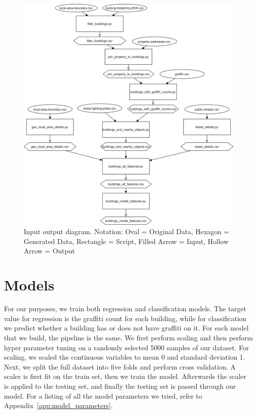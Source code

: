 \begin{figure}
   \centering
   \includegraphics[width=\textwidth]{images/MethodologyInputOutputDiagram.png}
   \caption{Input output diagram. Notation: Oval = Original Data, Hexagon = Generated Data, Rectangle = Script, Filled Arrow = Input, Hollow Arrow = Output}
   \label{fig:methodology}
\end{figure}


\section{Models}

For our purposes, we train both regression and classification models. The target value for regression is the graffiti count for each building, while for classification we predict whether a building has or does not have graffiti on it. For each model that we build, the pipeline is the same. We first perform scaling and then perform hyper parameter tuning on a randomly selected 5000 samples of our dataset. For scaling, we scaled the continuous variables to mean 0 and standard deviation 1. Next, we split the full dataset into five folds and perform cross validation. A scaler is first fit on the train set, then we train the model. Afterwards the scaler is applied to the testing set, and finally the testing set is passed through our model. For a listing of all the model parameters we tried, refer to Appendix~\ref{app:model_parameters}.

